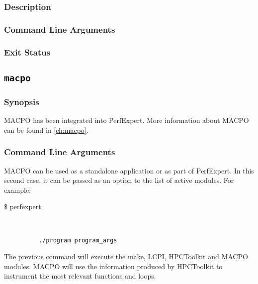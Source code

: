 \subsubsection{Description}

\subsubsection{Command Line Arguments}

\subsubsection{Exit Status}

\subsection{\texttt{macpo}}


\subsubsection{Synopsis}

MACPO has been integrated into PerfExpert. More information about MACPO can be found in \ref{ch:macpo}. 

\subsubsection{Command Line Arguments}

MACPO can be used as a standalone application or as part of PerfExpert. In this second case, 
it can be passed as an option to the list of active modules. For example:

%
%
%

\vspace{10pt}
\btt \$ perfexpert \par
\ \ \ \ \ \ \ \ \ \ \par 
\ \ \ \ \ \ \ \ \ \ \tt{./program  program\_args}\par
\normalfont
\vspace{10pt}


The previous command will execute the make, LCPI, HPCToolkit and MACPO modules. MACPO will use the information
produced by HPCToolkit to instrument the most relevant functions and loops.

